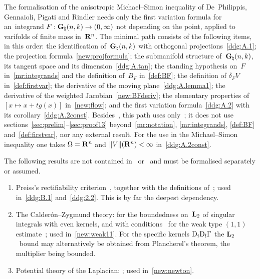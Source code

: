 \documentclass[a4paper,twoside,leqno]{article}
\newcommand{\Gk}{\pgrass{\adim}{\vdim}}        %
\begin{document}
\begin{remark}
    \label{rem:ms}
    The formalisation of the anisotropic Michael--Simon inequality of De~Philippis, Gennaioli,
    Pigati and Rindler needs only the first variation formula for an~integrand $F : \Gk \to
    (0,\infty)$ not depending on the point, applied to varifolds of finite mass in~$\mathbf{R}^{n}$.
    The minimal path consists of the following items, in this order: the identification of~$\Gk$
    with orthogonal projections~\ref{ddg:A.1}; the projection formula~\ref{new:projformula}; the
    submanifold structure of~$\Gk$, its tangent space and its dimension~\ref{ddg:A.tan}; the
    standing hypothesis on~$F$ in~\ref{mr:integrands} and the definition of~$B_F$
    in~\ref{def:BF}; the definition of $\delta_F V$ in~\ref{def:firstvar}; the derivative of the
    moving plane~\ref{ddg:A.lemma1}; the derivative of the
    weighted Jacobian~\ref{new:BFderiv}; the elementary properties of $[ x \mapsto x + t g(x) ]$
    in~\ref{new:flow}; and the first variation formula~\ref{ddg:A.2} with its
    corollary~\ref{ddg:A.2const}. Besides~\cite{Federer1969}, this path uses
    only~\cite[2.2, 2.3, 2.3(3), 2.3(4), 2.4(1), 3.1, 3.2(1)]{Allard1972}; it does not use
    sections~\ref{sec:prelim}--\ref{sec:proof13} beyond~\ref{mr:notation}, \ref{mr:integrands},
    \ref{def:BF} and~\ref{def:firstvar}, nor any external result. For the use in the
    Michael--Simon inequality one takes $\Omega = \mathbf{R}^{n}$ and $\|V\|(\mathbf{R}^{n}) < \infty$
    in~\ref{ddg:A.2const}.
\end{remark}

\begin{remark}
    \label{rem:external}
    The following results are not contained in~\cite{Federer1969} or~\cite{Allard1972} and must
    be formalised separately or assumed.
    \begin{enumerate}
        \item Preiss's rectifiability criterion~\cite[5.3]{Preiss1987}, together with the
        definitions of~\cite[1.1, 1.5, 1.6(8), 5.1(1)]{Preiss1987}; used in~\ref{ddg:B.1}
        and~\ref{ddg:2.2}. This is by far the deepest dependency.
        \item The Calder\'on--Zygmund theory: \cite[Theorem~5.2.10]{Grafakos2014} for the
        boundedness on~$\mathbf{L}_{2}$ of singular integrals with even kernels, and
        \cite[Theorem~5.3.3]{Grafakos2014} with conditions~\cite[(5.3.4), (5.3.7),
        (5.3.12)]{Grafakos2014} for the weak type $(1,1)$ estimate~\cite[(5.3.13)]{Grafakos2014};
        used in~\ref{new:weak11}. For the specific kernels $\mathrm{D}_i \mathrm{D}_l \Gamma$ the
        $\mathbf{L}_{2}$~bound may alternatively be obtained from Plancherel's theorem, the multiplier being
        bounded.
        \item Potential theory of the Laplacian: \cite[(2.12), (2.13), (2.17), Lemma~4.1,
        Lemma~4.2 and (4.9)]{Gilbarg2001a}; used in~\ref{new:newton}.
    \end{enumerate}
\end{remark}
\end{document}
